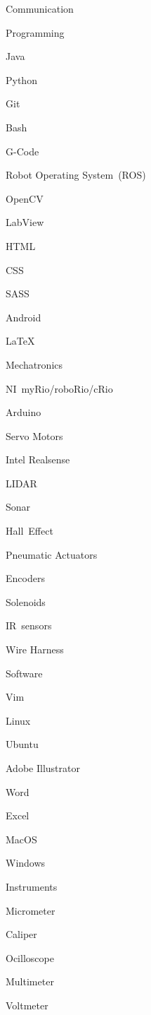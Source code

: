\documentclass{resume}
\begin{document}
\begin{skills}{Communication}
\begin{groupitem}{Programming}
    \item Java
    \item Python
    \item Git
    \item Bash
    \item G-Code
    \item Robot Operating System~(ROS)
    \item OpenCV
    \item LabView
    \item HTML
    \item CSS
    \item SASS
    \item Android
    \item \LaTeX
  \end{groupitem}
  \begin{groupitem}{Mechatronics}
    \item NI~myRio/roboRio/cRio
    \item Arduino
    \item Servo Motors
    \item Intel Realsense
    \item LIDAR
    \item Sonar
    \item Hall~Effect
    \item Pneumatic Actuators
    \item Encoders
    \item Solenoids
    \item IR~sensors
    \item Wire Harness
  \end{groupitem}
  \begin{groupitem}{Software}
    \item Vim
    \item Linux
    \item Ubuntu
    \item Adobe Illustrator
    \item Word
    \item Excel
    \item MacOS
    \item Windows
  \end{groupitem}
  \begin{groupitem}{Instruments}
    \item Micrometer
    \item Caliper
    \item Ocilloscope
    \item Multimeter
    \item Voltmeter

\end{groupitem}
\end{skills}
\end{document}
